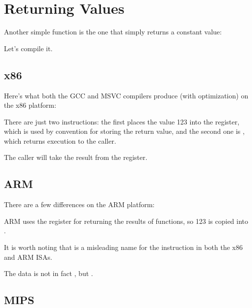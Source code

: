 \section{Returning Values}
\label{ret_val_func}

Another simple function is the one that simply returns a constant value:



Let's compile it.

\subsection{x86}

Here's what both the GCC and MSVC compilers produce (with optimization) on the x86 platform:



There are just two instructions: the first places the value 123 into the \EAX register,
which is used by convention for storing the return
value, and the second one is \RET, which returns execution to the \gls{caller}.

The caller will take the result from the \EAX register.

\subsection{ARM}

There are a few differences on the ARM platform:



ARM uses the register  for returning the results of functions, so 123 is copied into .

It is worth noting that \MOV is a misleading name for the instruction in both the x86 and ARM \ac{ISA}s.

The data is not in fact , but .

\subsection{MIPS}

\label{MIPS_leaf_function_ex1}

